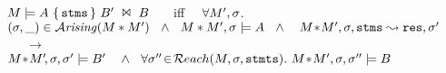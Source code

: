 \vspace{-.05in}
\begin{definition}\label{defn:validity}

\noindent
$M  \models  {\ensuremath{ {A}\ \{\, {{\textrm{\ttfamily{stms}}}}\, \}\ {B'}\ \Join\ {B} }}  $ \ \ \  iff \ \ 
  $\forall M',\sigma$.\\
\SP $ (\sigma,\_)\in \Arising(\M*\M')\  \ \wedge  \ \ \M*\M',  \sigma \models \A \  \ \wedge \ \   \  \M\!*\!\M', \sigma, \prg{stms}  \leadsto \prg{res}, \sigma'$\\
\SP\SP\SP\SP\SP\SP\SP\SP\SP\SP\SP \ \ \ $\longrightarrow$ \ \ \ \\
\SP $M\!*\!\M'\!, \sigma, \sigma' \models \B' \ \ \ \wedge \ \ \forall {\sigma''}\!\in\!\Reach(M,\sigma,\stmts).\ \M\!*\!\M', \sigma, {\sigma''} \models \B $
\end{definition}




\subsection{}
\label{section:formalPROOF}

